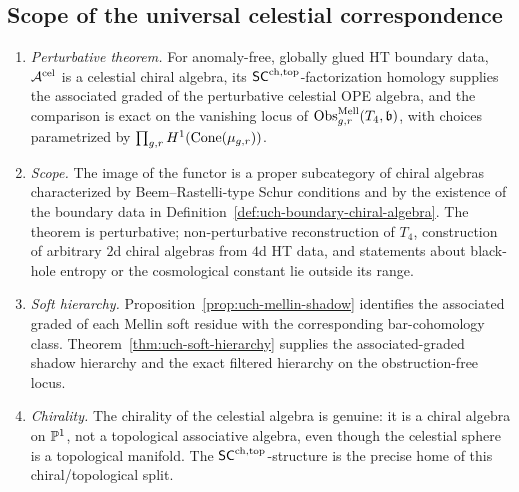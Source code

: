 \subsection*{Scope of the universal celestial correspondence}

\begin{enumerate}
\item \emph{Perturbative theorem.} For anomaly-free, globally glued
HT boundary data, $\mathcal A^{\mathrm{cel}}$ is a celestial chiral algebra,
its $\mathsf{SC}^{\mathrm{ch,top}}$-factorization homology supplies the associated graded
of the perturbative celestial OPE algebra, and the comparison is exact
on the vanishing locus of
$\operatorname{Obs}^{\mathrm{Mell}}_{g,r}(T_4,\mathfrak b)$, with choices
parametrized by \(\prod_{g,r}H^1(\operatorname{Cone}(\mu_{g,r}))\).

\item \emph{Scope.} The image of the functor is a proper
subcategory of chiral algebras characterized by
Beem--Rastelli-type Schur conditions and by the existence of the
boundary data in Definition~\ref{def:uch-boundary-chiral-algebra}.
The theorem is perturbative; non-perturbative reconstruction of $T_4$,
construction of arbitrary $2$d chiral algebras from $4$d HT data, and
statements about black-hole entropy or the cosmological constant lie
outside its range.

\item \emph{Soft hierarchy.} Proposition~\ref{prop:uch-mellin-shadow}
identifies the associated graded of each Mellin soft residue with the
corresponding bar-cohomology class. Theorem~\ref{thm:uch-soft-hierarchy}
supplies the associated-graded shadow hierarchy and the exact filtered
hierarchy on the obstruction-free locus.

\item \emph{Chirality.} The chirality of the celestial
algebra is genuine: it is a chiral algebra on $\mathbb P^1$, not a
topological associative algebra, even though the celestial sphere is a
topological manifold. The $\mathsf{SC}^{\mathrm{ch,top}}$-structure is the precise home
of this chiral/topological split.
\end{enumerate}

